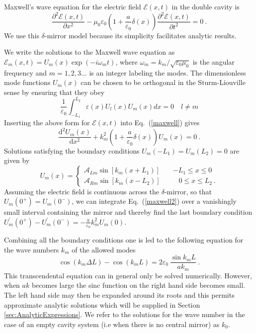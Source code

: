 \documentclass[twocolumn,english,pra,aps,superscriptaddress,floatfix]{revtex4-1}
\begin{document}
Maxwell's wave equation for the electric field $\mathcal{E}(x,t)$ in the double cavity is
\begin{equation}
\frac{\partial^{2}\mathcal{E}(x,t)}{\partial x^{2}}-\mu_{0}\varepsilon_{0}(1+\frac{a}{\varepsilon_{0}}\delta(x))\frac{\partial^{2}\mathcal{E}(x,t)}{\partial t^{2}}=0 \ .
\label{maxwell}
\end{equation}
We use this $\delta$-mirror model because its simplicity facilitates analytic results.  


We write the solutions to the Maxwell wave equation as $\mathcal{E}_{m}(x,t)=U_{m}(x) \exp(-i\omega_{m}t)$,  where $\omega_{m}=k_{m}/\sqrt{\varepsilon_{0}\mu_{0}}$ is the angular frequency and $m=1,2,3 \ldots$ is an integer labeling the modes. The dimensionless mode functions $U_{m}(x)$ can be chosen to be orthogonal
in the Sturm-Liouville sense by ensuring that they obey
\begin{equation}
\frac{1}{\varepsilon_{0}}\int_{-L_{1}}^{L_{2}}\varepsilon(x)U_{l}(x)U_{m}(x)dx=0 \quad  l \neq m
\label{normalization}
\end{equation}
Inserting the above form for $\mathcal{E}(x,t)$ into Eq.\ (\ref{maxwell}) gives
\begin{equation}
\frac{\mathrm{d}^{2}U_{m}(x)}{\mathrm{d}x^{2}}+k_{m}^{2}(1+\frac{a}{\varepsilon_{0}}\delta(x))U_{m}(x)=0 \ .
\label{maxwell2}
\end{equation}
Solutions satisfying the boundary conditions $U_{m}(-L_{1})=U_{m}(L_{2})=0$
are given by
\begin{equation}
U_{m}(x)=\begin{cases}
\mathcal{A}_{Lm}\sin \left[k_{m}(x+L_{1})\right]\quad & -L_{1} \leq x\leq0\\
\mathcal{A}_{Rm}\sin \left[k_{m}(x-L_{2})\right]\quad & \,\:\:\:0 \leq x \leq L_{2} \ . \end{cases}
\label{Wavemode}
\end{equation}
Assuming the electric field is continuous across
the $\delta$-mirror, so that $U_{m}(0^{+})=U_{m}(0^{-})$, we can integrate Eq.\ (\ref{maxwell2}) over a vanishingly small interval containing the mirror and thereby find the last boundary condition
$U_{m}^{\prime}(0^{+})-U_{m}^{\prime}(0^{-})=-\frac{a}{\varepsilon_{0}} k_{m}^{2}U_{m}(0)$.



Combining all the boundary conditions one is led to the following equation
for the wave numbers $k_{m}$ of the allowed modes \cite{lang73}
\begin{equation}
\cos(k_{m} \Delta L)-\cos(k_{m} L)=2\varepsilon_{0} \ \frac{\sin k_{m} L}{a k_{m}} \ .
\label{transcendental}
\end{equation}
This transcendental equation can in general only be solved numerically. However, when $a k$ becomes large the sinc function on the right hand side becomes small. The left hand side may then be expanded around its roots and this permits approximate analytic solutions which will be supplied in Section \ref{sec:AnalyticExpressions}.
We refer to the solutions for the wave number in the case of an empty cavity system (i.e when there is no central mirror) as $k_0$.
\end{document}
